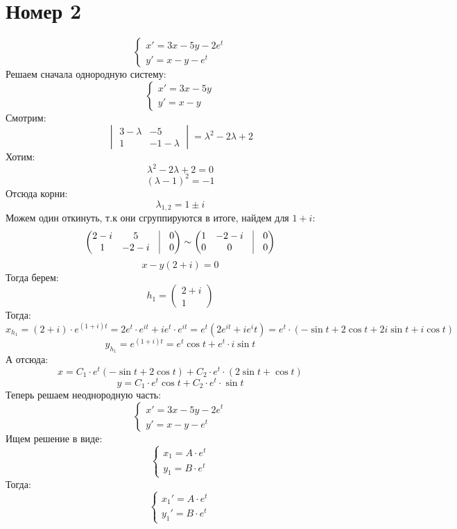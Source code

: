 \documentclass[a4paper,12pt]{article}
\begin{document}
\section*{Номер 2}
\[
\begin{cases}
x' = 3x -5y -2e^t \\
y' = x - y - e^t
\end{cases}
\]
Решаем сначала однородную систему:
\[
\begin{cases}
x' = 3x -5y \\
y' = x - y 
\end{cases}
\]
Смотрим:
\[
\begin{vmatrix}
3 - \lambda & -5 \\
1 & -1 - \lambda 
\end{vmatrix} = 
\lambda^2 -2 \lambda + 2 
\]
Хотим:
\[
\lambda^2 -2 \lambda + 2  = 0
\]
\[
(\lambda - 1)^2 = -1
\]
Отсюда корни:
\[
\lambda_{1, 2} = 1 \pm i
\]
Можем один откинуть, т.к они сгруппируются в итоге, найдем для $1 + i$:
\[
\begin{pmatrix}
2 -i & 5 & \vrule & 0 \\
1  & -2 - i & \vrule & 0 
\end{pmatrix} \sim 
\begin{pmatrix}
1 & -2 - i& \vrule & 0 \\
0& 0 & \vrule & 0 
\end{pmatrix} 
\]
\[
x - y(2 + i) = 0
\]
Тогда берем:
\[
h_1 = \begin{pmatrix}
2 + i  \\ 1
\end{pmatrix}
\]
Тогда:
\[
x_{h_1} = (2 + i) \cdot e^{(1 + i)t} = 2e^t \cdot e^{it} + ie^t \cdot e^{it} = e^t(2e^{it} + ie^it) = e^t \cdot (- \sin t + 2 \cos t + 2i \sin t + i \cos t)
\]
\[
y_{h_1} = e^{(1 +i)t} = e^t  \cos t + e^t  \cdot i \sin t 
\]
А отсюда:
\[
x = C_1 \cdot e^t(- \sin t + 2 \cos t) + C_2 \cdot e^t \cdot (2 \sin t + \cos t)
\]
\[
y = C_1 \cdot e^t \cos t + C_2 \cdot e^t \cdot \sin t
\]
Теперь решаем неоднородную часть:
\[
\begin{cases}
x' = 3x -5y  - 2e^t\\
y' = x - y  - e^t
\end{cases}
\]
Ищем решение в виде:
\[
\begin{cases}
x_1 = A \cdot e^{t} \\
y_1 = B \cdot e^t
\end{cases}
\]
Тогда:
\[
\begin{cases}
x_1' = A \cdot e^{t} \\
y_1'= B \cdot e^t
\end{cases}
\]
\end{document}
